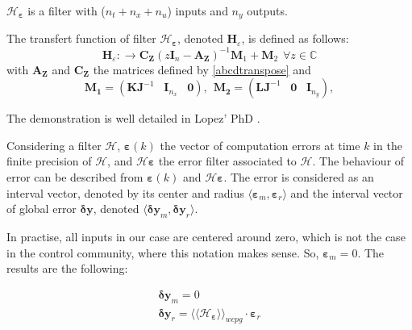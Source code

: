		$\mathcal{H}_{\boldsymbol{\varepsilon}}$ is a filter with ($n_t+n_x+n_u$) inputs and $n_y$ outputs.
		\begin{proposition}
			The transfert function of filter $\mathcal{H_{\boldsymbol{\varepsilon}}}$, denoted $\boldsymbol{H}_\varepsilon$, is defined as follows:
			\begin{equation}
				\boldsymbol{H}_{\varepsilon}: \rightarrow \boldsymbol{C_Z}(z\boldsymbol{I}_n-\boldsymbol{A_Z})^{-1}\boldsymbol{M}_1 +\boldsymbol{M}_2 \hspace{5pt} \forall z \in \mathbb{C}
			\end{equation}
			with $\boldsymbol{A_Z}$ and $\boldsymbol{C_Z}$ the matrices defined by \ref{abcdtranspose} and
			\begin{equation}
				\boldsymbol{M_1}=(\boldsymbol{KJ}^{-1}   \hspace{10pt}\boldsymbol{I}_{n_x} \hspace{10pt} \boldsymbol{0}), \hspace{5pt}
				\boldsymbol{M_2}=(\boldsymbol{LJ}^{-1}  \hspace{10pt}\boldsymbol{0} \hspace{10pt}\boldsymbol{I}_{n_y}), 
			\end{equation}
		\end{proposition}
		The demonstration is well detailed in Lopez' PhD \cite{lopez}.

		\begin{corollary} \label{corimp}
			Considering a filter $\mathcal{H}$, $\boldsymbol{\varepsilon}(k)$ the vector of computation errors at time $k$ in the finite precision of $\mathcal{H}$,
			and $\mathcal{H}\boldsymbol{\varepsilon}$ the error filter associated to $\mathcal{H}$.
			The behaviour of error can be described from $\boldsymbol{\varepsilon}(k)$ and $\mathcal{H}\boldsymbol{\varepsilon}$.
			The error is considered as an interval vector, denoted by its center and radius $\langle \boldsymbol{\varepsilon}_m, \boldsymbol{\varepsilon}_r \rangle$ and 
			the interval vector of global error $\boldsymbol{\delta y}$, denoted $\langle \boldsymbol{\delta y}_m, \boldsymbol{\delta y}_r \rangle$.

			In practise, all inputs in our case are centered around zero, which is not the case in the control community, where this notation makes sense.
			So, $\boldsymbol{\varepsilon}_m=0$.
			The results are the following:

			\begin{eqnarray} \label{eqprec}
				\boldsymbol{\delta y}_m = 0 \\
				\boldsymbol{\delta y}_r = \langle\langle \mathcal{H}_{\boldsymbol{\varepsilon}} \rangle\rangle_{wcpg} \cdot \boldsymbol{\varepsilon}_r
			\end{eqnarray}
		\end{corollary}

